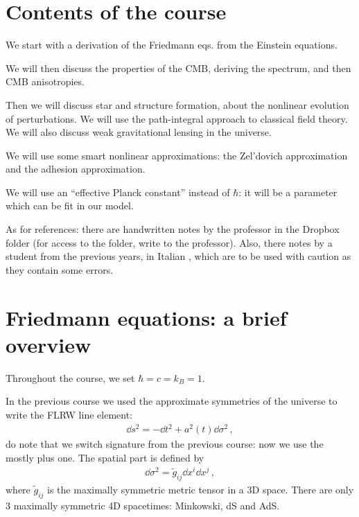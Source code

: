 \documentclass[main.tex]{subfiles}
\begin{document}
\section*{Contents of the course}

We start with a derivation of the Friedmann eqs. from the Einstein equations. 

We will then discuss the properties of the CMB, deriving the spectrum, and then CMB anisotropies. 

Then we will discuss star and structure formation, about the nonlinear evolution of perturbations. 
We will use the path-integral approach to classical field theory. 
We will also discuss weak gravitational lensing in the universe.

We will use some smart nonlinear approximations: the Zel'dovich approximation and the adhesion approximation.

We will use an ``effective Planck constant'' instead of \(\hbar\): it will be a parameter which can be fit in our model. 

As for references: there are handwritten notes by the professor in the Dropbox folder (for access to the folder, write to the professor).
Also, there notes by a student from the previous years, in Italian \cite{nataleNoteCorsoDi2017}, which are to be used with caution as they contain some errors. 




\section{Friedmann equations: a brief overview}


Throughout the course, we set \(\hbar = c = k_B = 1\).

In the previous course we used the approximate symmetries of the universe to write the FLRW line element: 
%
\begin{align}
\dd{s^2} = -\dd{t^2} + a^2(t) \dd{\sigma^2}
\,,
\end{align}
%
do note that we switch signature from the previous course: now we use the mostly plus one.
The spatial part is defined by 
%
\begin{align}
\dd{\sigma^2} = \widetilde{g}_{ij} \dd{x^{i}} \dd{x^{j}}
\,,
\end{align}
%
where \(\widetilde{g}_{ij}\) is the maximally symmetric metric tensor in a 3D space. 
There are only 3 maximally symmetric 4D spacetimes: Minkowski, dS and AdS.
\end{document}
